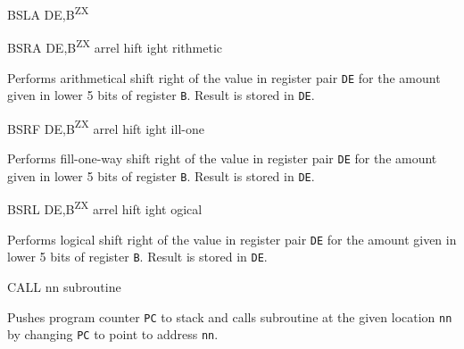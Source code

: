 \documentclass[12pt,twoside,openright,a4paper]{book}
\newcommand{\ZXN}{\textnormal{\textsuperscript{ZX}}}
\begin{document}
\begin{basedescript}{
	\desclabelstyle{\multilinelabel}
	\desclabelwidth{3cm}}
\begin{DetailItem}{BSLA DE,B\ZXN}
	\end{DetailItem}

	\begin{DetailItem}{BSRA DE,B\ZXN}
		{arrel hift ight rithmetic}
		{\SymBSRA}

		Performs arithmetical shift right of the value in register pair {\tt DE} for the amount given in lower 5 bits of register {\tt B}. Result is stored in {\tt DE}.

		\DetailNoEffect
		
		\begin{DetailTiming}
		\end{DetailTiming}

	\end{DetailItem}

	\begin{DetailItem}{BSRF DE,B\ZXN}
		{arrel hift ight ill-one}
		{\SymBSRF}

		Performs fill-one-way shift right of the value in register pair {\tt DE} for the amount given in lower 5 bits of register {\tt B}. Result is stored in {\tt DE}.

		\DetailNoEffect
		
		\begin{DetailTiming}
			\DetailTime{}{2}{8}
		\end{DetailTiming}

	\end{DetailItem}

	\begin{DetailItem}{BSRL DE,B\ZXN}
		{arrel hift ight ogical}
		{\SymBSRL}

		Performs logical shift right of the value in register pair {\tt DE} for the amount given in lower 5 bits of register {\tt B}. Result is stored in {\tt DE}.

		\DetailNoEffect
		
		\begin{DetailTiming}
		\end{DetailTiming}

	\end{DetailItem}
	
	\pagebreak
	\begin{DetailItem}{CALL nn}
		{ subroutine}
		{\SymCALL{nn}}

		Pushes program counter {\tt PC} to stack and calls subroutine at the given location {\tt nn} by changing {\tt PC} to point to address {\tt nn}.


\end{DetailItem}
\end{basedescript}
\end{document}
